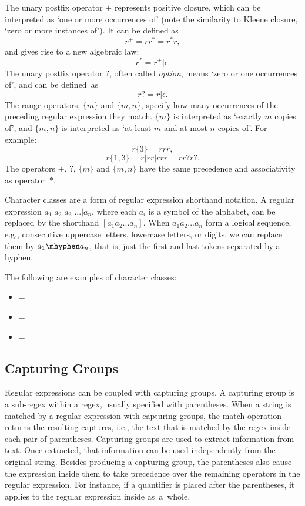 The unary postfix operator \(+\) represents positive closure, which can be interpreted as `one or more occurrences of' (note the similarity to Kleene closure, `zero or more instances of'). It can be defined as
\[r^+ = rr^* = r^*r,\]
and gives rise to a new algebraic law:
\[r^* = r^+|\epsilon.\]
%
The unary postfix operator \(?\), often called \textit{option}, means `zero or one
occurrences of', and can be defined~as
\[ r? = r|\epsilon. \]
%
The range operators, \(\{m\}\) and \(\{m,n\}\), specify how many occurrences of the preceding regular expression they match. \(\{m\}\) is interpreted as `exactly \(m\) copies of', and \(\{m,n\}\) is interpreted as `at least \(m\) and at most \(n\) copies of'. For example:
\[r\{3\} = rrr,\]
\[r\{1,3\} = r|rr|rrr = rr?r?.\]
%
The operators \(+\), \(?\), \(\{m\}\) and \(\{m,n\}\) have the same precedence and associativity as operator~\(*\).


Character classes are a form of regular expression shorthand notation. A regular expression \(a_1|a_2|a_3|...|a_n\), where each \(a_i\) is a symbol of the alphabet, can be replaced by the shorthand \([a_1 a_2...a_n]\).
When \(a_1 a_2...a_n\) form a logical sequence, e.g., consecutive uppercase letters, lowercase letters, or digits, we
can replace them by \(a_1\mhyphen a_n\), that is, just the first and last tokens separated by
a hyphen.


\begin{example}
The following are examples of character classes:
\begin{itemize}
\item \regex{[abc]} = 
\item \regex{[a\mhyphen z]} = 
\item {} = 
\end{itemize}
\end{example}

\subsection{Capturing Groups}

Regular expressions can be coupled with capturing groups.
%
A capturing group is a sub-regex within a regex, usually specified with parentheses. %
When a string is matched by a regular expression with capturing groups, the match operation returns the resulting captures, i.e., the text that is matched by the regex inside each pair of parentheses. Capturing groups are used to extract information from text. Once extracted, that information can be used independently from the original string.
Besides producing a capturing group, the parentheses also cause the expression inside them to take precedence over the remaining operators in the regular expression.
For instance, if a quantifier is placed after the parentheses, it applies to the regular expression inside as~a~whole.

